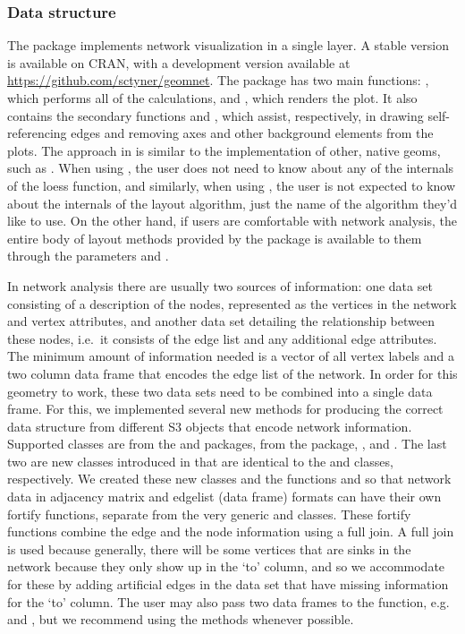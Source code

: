 \subsubsection{Data structure}

The package  implements network visualization in a single  layer. A stable version is available on CRAN, with a development version available at \url{https://github.com/sctyner/geomnet}. The package has two main functions:  , which performs all of the calculations, and , which renders the plot. It also contains the secondary functions  and , which assist, respectively, in drawing self-referencing edges and removing axes and other background elements from the plots.
The approach in  is similar to the implementation of other, native  geoms, such as . When using , the user does not need to know about any of the internals of the loess function, and similarly, when using , the user is not expected to know about the internals of the layout algorithm, just the name of the algorithm they'd like to use. On the other hand, if users are comfortable with network analysis, the entire body of layout methods provided by the  package is available to them through the parameters  and .

In network analysis there are usually two sources of information: one data set consisting of a description of the nodes, represented as the vertices in the network and vertex attributes, and another data set detailing the relationship between these nodes, i.e.\ it consists of the edge list and any additional edge attributes. The minimum amount of information needed is a vector of all vertex labels and a two column data frame that encodes the edge list of the network. In order for this geometry to work, these two data sets need to be combined into a single data frame. For this, we implemented several new  methods for producing the correct data structure from different S3 objects that encode network information. Supported classes are  from the  and  packages,  from the  package, , and . The last two are new classes introduced in  that are identical to the  and  classes, respectively. We created these new classes and the functions  and  so that network data in adjacency matrix and edgelist (data frame) formats can have their own fortify functions, separate from the very generic  and  classes. These fortify functions combine the edge and the node information using a full join. A full join is used because generally, there will be some vertices that are sinks in the network because they only show up in the `to' column, and so we accommodate for these by adding artificial edges in the data set that have missing information for the `to' column. The user may also pass two data frames to the function, e.g.\  and , but we recommend using the  methods whenever possible.

